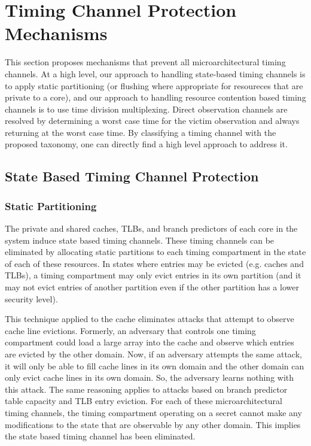 \section{Timing Channel Protection Mechanisms}
This section proposes mechanisms that prevent all microarchitectural timing 
channels. At a high level, our approach to handling state-based timing channels 
is to apply static partitioning (or flushing where appropriate for resoureces 
that are private to a core), and our approach to handling resource contention 
based timing channels is to use time division multiplexing. Direct observation
channels are resolved by determining a worst case time for the victim 
observation and always returning at the worst case time. By classifying a 
timing channel with the proposed taxonomy, one can directly find a high level 
approach to address it. 

\subsection{State Based Timing Channel Protection}
\subsubsection{Static Partitioning}
The private and shared caches, TLBs, and branch predictors of each core in the 
system induce state based timing channels. These timing channels can be 
eliminated by allocating static partitions to each timing compartment in the 
state of each of these resources. In states where entries may be evicted (e.g.  
caches and TLBs), a timing compartment may only evict entries in its own 
partition (and it may not evict entries of another partition even if the other 
partition has a lower security level).

This technique applied to the cache eliminates attacks that attempt to observe 
cache line evictions. Formerly, an adversary that controls one timing 
compartment could load a large array into the cache and observe which entries 
are evicted by the other domain. Now, if an adversary attempts the same attack, 
it will only be able to fill cache lines in its own domain and the other domain 
can only evict cache lines in its own domain. So, the adversary learns nothing 
with this attack. The same reasoning applies to attacks based on branch 
predictor table capacity and TLB entry eviction. For each of these 
microarchitectural timing channels, the timing compartment operating on a 
secret cannot make any modifications to the state that are observable by any 
other domain. This implies the state based timing channel has been eliminated.

